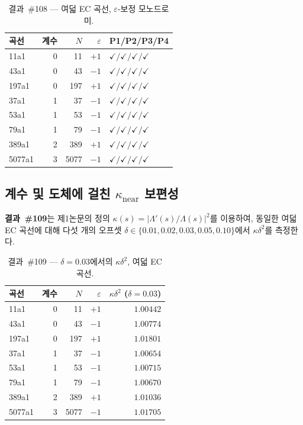 \documentclass[11pt, a4paper]{article}
\theoremstyle{plain}
\theoremstyle{definition}
\begin{document}
\begin{table}[ht]
\centering
\caption{결과~\#108 — 여덟 EC 곡선, $\varepsilon$-보정 모노드로미.}
\label{tab:ec108}
\small
\begin{tabular}{lrrrl}
\toprule
곡선 & 계수 & $N$ & $\varepsilon$ & P1/P2/P3/P4 \\
\midrule
11a1  & 0 & 11   & $+1$ & $\checkmark/\checkmark/\checkmark/\checkmark$ \\
43a1  & 0 & 43   & $-1$ & $\checkmark/\checkmark/\checkmark/\checkmark$ \\
197a1 & 0 & 197  & $+1$ & $\checkmark/\checkmark/\checkmark/\checkmark$ \\
37a1  & 1 & 37   & $-1$ & $\checkmark/\checkmark/\checkmark/\checkmark$ \\
53a1  & 1 & 53   & $-1$ & $\checkmark/\checkmark/\checkmark/\checkmark$ \\
79a1  & 1 & 79   & $-1$ & $\checkmark/\checkmark/\checkmark/\checkmark$ \\
389a1 & 2 & 389  & $+1$ & $\checkmark/\checkmark/\checkmark/\checkmark$ \\
5077a1& 3 & 5077 & $-1$ & $\checkmark/\checkmark/\checkmark/\checkmark$ \\
\bottomrule
\end{tabular}
\end{table}


\subsection{계수 및 도체에 걸친 $\kappa_{\mathrm{near}}$ 보편성}
\label{ssec:thm5}

\textbf{결과~\#109}는 제1논문의 정의
$\kappa(s)=|\Lambda'(s)/\Lambda(s)|^{2}$를 이용하여,
동일한 여덟 EC 곡선에 대해
다섯 개의 오프셋 $\delta\in\{0.01,0.02,0.03,0.05,0.10\}$에서
$\kappa\delta^{2}$를 측정한다.

\begin{table}[ht]
\centering
\caption{결과~\#109 — $\delta=0.03$에서의 $\kappa\delta^{2}$, 여덟 EC 곡선.}
\label{tab:ec109}
\small
\begin{tabular}{lrrrr}
\toprule
곡선 & 계수 & $N$ & $\varepsilon$ & $\kappa\delta^{2}$ ($\delta=0.03$) \\
\midrule
11a1   & 0 & 11    & $+1$ & $1.00442$ \\
43a1   & 0 & 43    & $-1$ & $1.00774$ \\
197a1  & 0 & 197   & $+1$ & $1.01801$ \\
37a1   & 1 & 37    & $-1$ & $1.00654$ \\
53a1   & 1 & 53    & $-1$ & $1.00715$ \\
79a1   & 1 & 79    & $-1$ & $1.00670$ \\
389a1  & 2 & 389   & $+1$ & $1.01036$ \\
5077a1 & 3 & 5077  & $-1$ & $1.01705$ \\
\bottomrule
\end{tabular}
\end{table}
\end{document}
